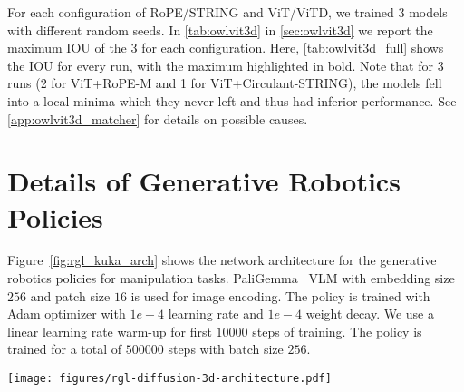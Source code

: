 For each configuration of RoPE/STRING and ViT/ViTD, we trained 3 models with different random seeds.
In \cref{tab:owlvit3d} in \cref{sec:owlvit3d} we report the maximum IOU of the 3 for each configuration.
Here, \cref{tab:owlvit3d_full} shows the IOU for every run, with the maximum highlighted in bold.
Note that for 3 runs (2 for ViT+RoPE-M and 1 for ViT+Circulant-STRING), the models fell into a local minima which they never left and thus had inferior performance.
See \cref{app:owlvit3d_matcher} for details on possible causes.

\section{Details of Generative Robotics Policies}
\label{app:rgl_3d}
Figure~\ref{fig:rgl_kuka_arch} shows the network architecture for the generative robotics policies for manipulation tasks. PaliGemma~\cite{beyer2024paligemma} VLM with embedding size $256$ and patch size $16$ is used for image encoding. The policy is trained with Adam optimizer with $1e-4$ learning rate and $1e-4$ weight decay. We use a linear learning rate warm-up for first $10000$ steps of training. The policy is trained for a total of $500000$ steps with batch size $256$.

\begin{figure*}
\centering
\texttt{[image: figures/rgl-diffusion-3d-architecture.pdf]}
\caption{Generative policy architecture for robotic manipulation using Kuka-IIWA arms.}
\label{fig:rgl_kuka_arch}
\end{figure*}
